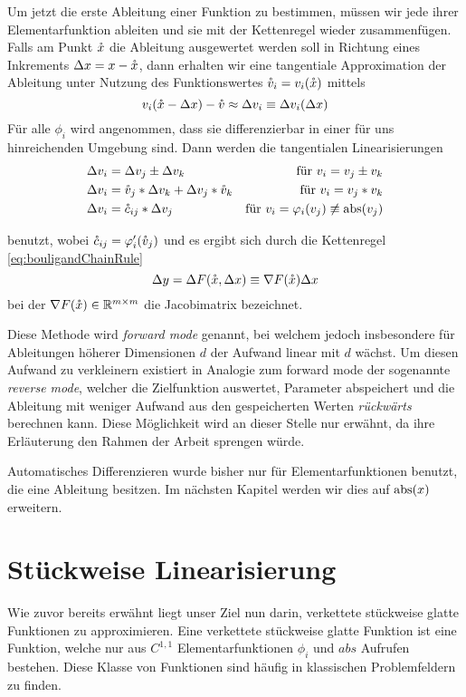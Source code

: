 Um jetzt die erste Ableitung einer Funktion zu bestimmen, müssen wir jede ihrer Elementarfunktion ableiten und sie mit der Kettenregel wieder zusammenfügen. Falls am Punkt $\mathring{x}$ die Ableitung ausgewertet werden soll in Richtung eines Inkrements $\Delta x = x- \mathring{x} $, dann erhalten wir eine tangentiale Approximation der Ableitung unter Nutzung des Funktionswertes $\mathring{v}_i = v_i(\mathring{x})$ mittels 
\begin{equation}
\label{eq:plApproximation}
v_i(\mathring{x} - \Delta x) -\mathring{v} \approx \Delta v_i \equiv \Delta v_i(\Delta x) 
\end{equation}
Für alle $\phi_i$ wird angenommen, dass sie differenzierbar in einer für uns hinreichenden Umgebung sind. Dann werden die tangentialen Linearisierungen
\begin{equation}
\begin{aligned}
\Delta v_i &= \Delta v_j \pm \Delta v_k & \text{für } v_i = v_j \pm v_k\\
\Delta v_i &= \mathring{v}_j* \Delta v_k +\Delta v_j*\mathring{v}_k& \text{für } v_i = v_j * v_k\\
\Delta v_i &= \mathring c_{ij} * \Delta v_j  & \text{für } v_i = \varphi_i(v_j) \not \equiv \operatorname{abs}(v_j)
\end{aligned}
\label{eq:stdAdRules}
\end{equation}

benutzt, wobei $\mathring c_{ij} = \varphi'_i(\mathring{v}_j)$
und es ergibt sich durch die Kettenregel \eqref{eq:bouligandChainRule}
\[
 \Delta y = \Delta F(\mathring{x},\Delta x) \equiv \nabla F(\mathring{x})\Delta x
\]
bei der $\nabla F(\mathring{x})\in \mathbb{R}^{m\times m}$ die Jacobimatrix bezeichnet.

Diese Methode wird \textit{forward mode} genannt, bei welchem jedoch insbesondere für Ableitungen höherer Dimensionen $d$ der Aufwand linear mit $d$ wächst. Um diesen Aufwand zu verkleinern existiert in Analogie zum forward mode der sogenannte \textit{reverse mode}, welcher die Zielfunktion auswertet, Parameter abspeichert und die Ableitung mit weniger Aufwand aus den gespeicherten Werten \textit{rückwärts} berechnen kann. Diese Möglichkeit wird an dieser Stelle nur erwähnt, da ihre Erläuterung den Rahmen der Arbeit sprengen würde.

Automatisches Differenzieren wurde bisher nur für Elementarfunktionen benutzt, die eine Ableitung besitzen. Im nächsten Kapitel werden wir dies auf $\operatorname{abs}(x)$ erweitern.


\section{Stückweise Linearisierung}
Wie zuvor bereits erwähnt liegt unser Ziel nun darin, verkettete stückweise glatte Funktionen zu approximieren. Eine verkettete stückweise glatte Funktion ist eine Funktion, welche nur aus $C^{1,1}$ Elementarfunktionen $\phi_i$ und $abs$ Aufrufen bestehen. Diese Klasse von Funktionen sind häufig in klassischen Problemfeldern zu finden.

